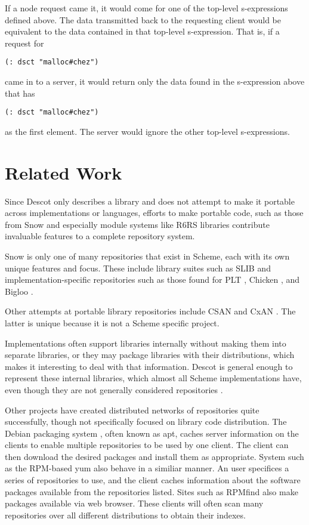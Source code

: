 \documentclass[9pt,cm,twocolumn,preprint]{sigplanconf}
\begin{document}
If a node request came it, it would come for one of the top-level 
s-expressions defined above. The data transmitted back to the 
requesting client would be equivalent to the data contained in 
that top-level s-expression. That is, if a request for 

\medskip
{\narrower\tt (:\ dsct "malloc\#chez")}
\medskip

\noindent came in to a server, it would return 
only the data found in the s-expression above that has 

\medskip
{\narrower\tt (:\ dsct "malloc\#chez")}
\medskip

\noindent as the first element. 
The server would ignore the other top-level s-expressions.


\section{Related Work}
\label{related_work}
Since Descot only describes a library and does not attempt to 
make it portable across implementations or languages, 
efforts to make portable code, such as those from Snow \cite{snow} 
and especially module systems like R6RS libraries \cite{r6rs} contribute 
invaluable features to a complete repository system. 

Snow is only one of many repositories that exist in Scheme, 
each with its own unique features and focus. These include 
library suites such as SLIB \cite{slib} and implementation-specific 
repositories such as those found for PLT \cite{planet}, 
Chicken \cite{eggs}, and Bigloo \cite{bigloorepo}. 

Other attempts at portable library repositories include CSAN \cite{csan} 
and CxAN \cite{cxan}. The latter is unique because it is not a 
Scheme specific project. 

Implementations often support libraries internally without making 
them into separate libraries, or they may package libraries with 
their distributions, which makes it interesting to deal with that 
information. Descot is general enough to represent these internal 
libraries, which almost all Scheme implementations have, even 
though they are not generally considered repositories 
\cite{scheme48,chez,mit_scheme}. 

Other projects have created distributed networks of repositories 
quite successfully, though not specifically focused on library 
code distribution. The Debian packaging system \cite{debian}, 
often known as apt, caches server information on the clients to 
enable multiple repositories to be used by one client. The client 
can then download the desired packages and install them as 
appropriate. System such as the RPM-based \cite{rpm} yum \cite{yum} 
also behave in a similiar manner. An user specifices a series of 
repositories to use, and the client caches information about the 
software packages available from the repositories listed. 
Sites such as RPMfind \cite{rpmfind} also make packages available 
via web browser. These clients will often scan many repositories 
over all different distributions to obtain their indexes. 
\end{document}
